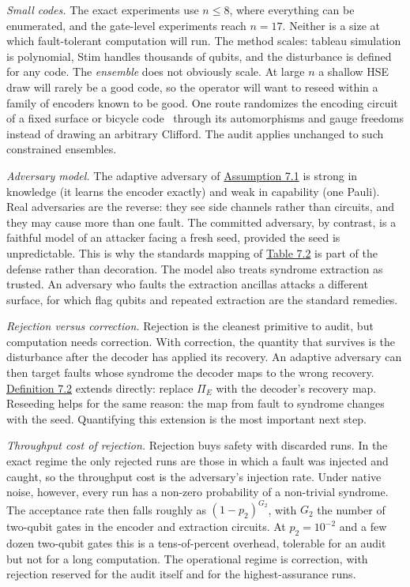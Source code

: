 \documentclass{report}
\theoremstyle{plain}
\theoremstyle{definition}
\theoremstyle{remark}
\begin{document}
\emph{Small codes.} The exact experiments use $n\le 8$, where everything can be enumerated, and the gate-level experiments reach $n=17$. Neither is a size at which fault-tolerant computation will run. The method scales: tableau simulation is polynomial, Stim handles thousands of qubits, and the disturbance is defined for any code. The \emph{ensemble} does not obviously scale. At large $n$ a shallow HSE draw will rarely be a good code, so the operator will want to reseed within a family of encoders known to be good. One route randomizes the encoding circuit of a fixed surface or bicycle code~\cite{fowler2012surfacecodes,bravyi2024bicycle} through its automorphisms and gauge freedoms instead of drawing an arbitrary Clifford. The audit applies unchanged to such constrained ensembles.

\emph{Adversary model.} The adaptive adversary of \hyperref[ass:qec:model]{Assumption 7.1} is strong in knowledge (it learns the encoder exactly) and weak in capability (one Pauli). Real adversaries are the reverse: they see side channels rather than circuits, and they may cause more than one fault. The committed adversary, by contrast, is a faithful model of an attacker facing a fresh seed, provided the seed is unpredictable. This is why the standards mapping of \hyperref[tab:qec:protocol]{Table 7.2} is part of the defense rather than decoration. The model also treats syndrome extraction as trusted. An adversary who faults the extraction ancillas attacks a different surface, for which flag qubits and repeated extraction are the standard remedies.

\emph{Rejection versus correction.} Rejection is the cleanest primitive to audit, but computation needs correction. With correction, the quantity that survives is the disturbance after the decoder has applied its recovery. An adaptive adversary can then target faults whose syndrome the decoder maps to the wrong recovery. \hyperref[def:qec:disturbance]{Definition 7.2} extends directly: replace $\Pi_E$ with the decoder's recovery map. Reseeding helps for the same reason: the map from fault to syndrome changes with the seed. Quantifying this extension is the most important next step.

\emph{Throughput cost of rejection.} Rejection buys safety with discarded runs. In the exact regime the only rejected runs are those in which a fault was injected and caught, so the throughput cost is the adversary's injection rate. Under native noise, however, every run has a non-zero probability of a non-trivial syndrome. The acceptance rate then falls roughly as $(1-p_2)^{G_2}$, with $G_2$ the number of two-qubit gates in the encoder and extraction circuits. At $p_2=10^{-2}$ and a few dozen two-qubit gates this is a tens-of-percent overhead, tolerable for an audit but not for a long computation. The operational regime is correction, with rejection reserved for the audit itself and for the highest-assurance runs.
\end{document}
